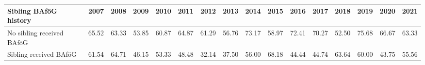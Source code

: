 \begin{landscape}
\begin{table}[htbp]
\begin{tabular}{lccccccccccccccc}
\midrule
Sibling BAföG history & 2007 & 2008 & 2009 & 2010 & 2011 & 2012 & 2013 & 2014 & 2015 & 2016 & 2017 & 2018 & 2019 & 2020 & 2021 \\
\midrule
No sibling received BAföG & 65.52 & 63.33 & 53.85 & 60.87 & 64.87 & 61.29 & 56.76 & 73.17 & 58.97 & 72.41 & 70.27 & 52.50 & 75.68 & 66.67 & 63.33 \\
Sibling received BAföG    & 61.54 & 64.71 & 46.15 & 53.33 & 48.48 & 32.14 & 37.50 & 56.00 & 68.18 & 44.44 & 44.74 & 63.64 & 60.00 & 43.75 & 55.56 \\
\bottomrule
\end{tabular}
\end{table}
\end{landscape}
